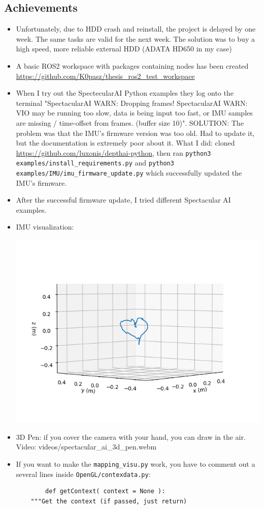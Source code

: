 \documentclass{article}
\begin{document}
\subsection{Achievements}
\begin{itemize}
    \item Unfortunately, due to HDD crash and reinstall, the project is delayed by one week. The same tasks are valid for the next week. The solution was to buy a high speed, more reliable external HDD (ADATA HD650 in my case)
    \item A basic ROS2 workspace with packages containing nodes has been created \url{https://github.com/K0pasz/thesis_ros2_test_workspace}
    \item When I try out the SpectecularAI Python examples they log onto the terminal "SpectacularAI WARN: Dropping frames!
SpectacularAI WARN:   VIO may be running too slow, data is being input too fast, or IMU samples are missing / time-offset from frames. (buffer size 10)". SOLUTION: The problem was that the IMU's firmware version was too old. Had to update it, but the documentation is extremely poor about it. What I did: cloned \url{https://github.com/luxonis/depthai-python}, then ran \verb|python3 examples/install_requirements.py| and \verb|python3 examples/IMU/imu_firmware_update.py| which successfully updated the IMU's firmware.
    \item After the successful firmware update, I tried different Spectacular AI examples.
    \item IMU visualization:\par
    \begin{minipage}{\linewidth}
        \centering
        \includegraphics[width=1\linewidth]{spectacular_ai_vio_visu.png}
    \end{minipage}
    \item 3D Pen: if you cover the camera with your hand, you can draw in the air. Video: videos/spectacular\_ai\_3d\_pen.webm
    \item If you want to make the \verb|mapping_visu.py| work, you have to comment out a several lines inside \verb|OpenGL/contexdata.py|:
    \begin{verbatim}
        def getContext( context = None ):
    """Get the context (if passed, just return)
    

\end{verbatim}
\end{itemize}
\end{document}
